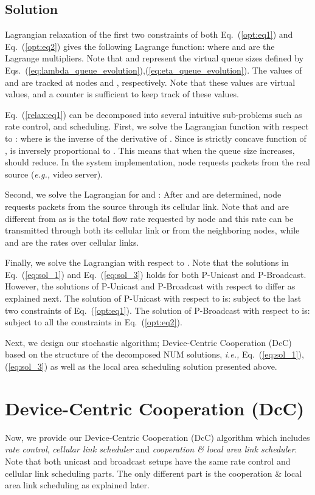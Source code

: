 \documentclass[conference]{IEEEtran}
\newcommand{\ie}{{\em i.e., }}
\newcommand{\eg}{{\em e.g., }}
\begin{document}
\subsection{\label{sec:NUM_Solution} Solution}
Lagrangian relaxation of the first two constraints of both Eq.~(\ref{opt:eq1}) and Eq.~(\ref{opt:eq2}) gives the following Lagrange function:
 where  and  are the Lagrange multipliers. Note that  and  represent the virtual queue sizes defined by Eqs.~(\ref{eq:lambda_queue_evolution}),(\ref{eq:eta_queue_evolution}). The values of  and  are tracked at nodes  and , respectively. Note that these values are virtual values, and a counter is sufficient to keep track of these values.


Eq.~(\ref{relax:eq1}) can be decomposed into several intuitive sub-problems such as rate control, and scheduling. First, we solve the Lagrangian function with respect to :
 where  is the inverse of the derivative of  . Since  is strictly concave function of ,  is inversely proportional to . This means that when the queue size  increases,  should reduce.
In the system implementation, node  requests  packets from the real source (\eg video server).

Second, we solve the Lagrangian for  and :
 After  and  are determined, node  requests  packets from the source through its cellular link. Note that  and  are different from  as  is the total flow rate requested by node  and this rate can be transmitted through both its cellular link or from the neighboring nodes, while  and  are the rates over cellular links.

Finally, we solve the Lagrangian with respect to . Note that the solutions in Eq.~(\ref{eq:sol_1}) and Eq.~(\ref{eq:sol_3}) holds for both P-Unicast and P-Broadcast. However, the solutions of P-Unicast and P-Broadcast with respect to  differ as explained next. The solution of P-Unicast with respect to  is:  subject to the last two constraints of Eq.~(\ref{opt:eq1}). The solution of P-Broadcast with respect to  is:  subject to all the constraints in Eq.~(\ref{opt:eq2}).

Next, we design our stochastic algorithm; Device-Centric Cooperation (DcC) based on the structure of the decomposed NUM solutions, \ie Eq.~(\ref{eq:sol_1}),(\ref{eq:sol_3}) as well as the local area scheduling solution presented above.


\section{\label{sec:DcC} Device-Centric Cooperation (DcC)}
Now, we provide our Device-Centric Cooperation (DcC) algorithm  which includes {\em rate control}, {\em cellular link scheduler} and {\em cooperation \& local area link scheduler}. Note that both unicast and broadcast setups have the same rate control and cellular link scheduling parts. The only different part is the cooperation \& local area link scheduling as explained later.
\end{document}
